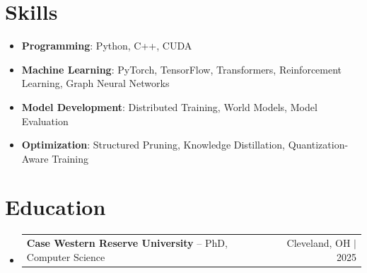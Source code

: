 \documentclass[letterpaper,13pt]{article}
\makeatletter
\newcommand{\resumeProjectHeading}[2]{
    \item
    \begin{tabular*}{\textwidth}{l@{\extracolsep{\fill}}r}
      \small#1 & #2 \\
    \end{tabular*}\vspace{-4pt}
}
\newcommand{\resumeSubHeadingListStart}{\begin{itemize}[leftmargin=0in, label={}]}
\newcommand{\resumeSubHeadingListEnd}{\end{itemize}}
\makeatother
\begin{document}
\section{Skills}
\vspace{0.02cm}
\begin{itemize}[leftmargin=0.15in, label={}, itemsep=2pt, topsep=1pt]
  \item \textbf{Programming}: Python, C++, CUDA
  \item \textbf{Machine Learning}: PyTorch, TensorFlow, Transformers, Reinforcement Learning, Graph Neural Networks
  \item \textbf{Model Development}: Distributed Training, World Models, Model Evaluation
  \item \textbf{Optimization}: Structured Pruning, Knowledge Distillation, Quantization-Aware Training
\end{itemize}
\vspace{0.02cm}

\section{Education}
\resumeSubHeadingListStart
  \resumeProjectHeading{\textbf{Case Western Reserve University} -- PhD, Computer Science}{Cleveland, OH $|$ 2025}
\resumeSubHeadingListEnd
\end{document}
